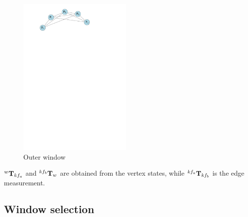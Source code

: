 \begin{figure}[h!]
  \centering
    \includegraphics[width=0.5\textwidth]{chapters/images/outer_window}
  \caption{Outer window}
  \label{fig:outer_window}
\end{figure}

$^{w}\mathbf T_{kf_a}$ and $^{kf_b} \mathbf T_{w}$ are obtained from the vertex states, while $^{kf_a} \mathbf T_{kf_b}$ is the edge measurement.

\subsection{Window selection}


%
